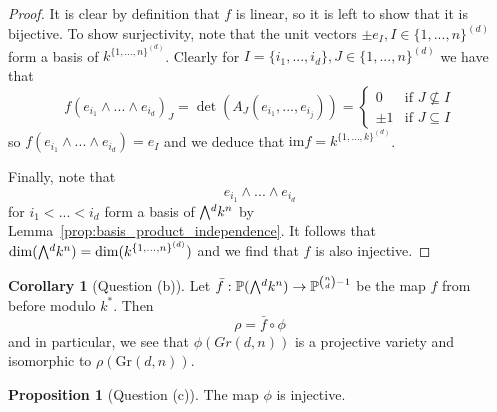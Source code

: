 \documentclass{scrartcl}
\newcommand{\Proj}{\mathbb{P}}
\newcommand{\Gr}{\mathrm{Gr}}
\newcommand{\extpow}{\mathchoice{{\textstyle\bigwedge}}
    {{\bigwedge}}
    {{\textstyle\wedge}}
    {{\scriptstyle\wedge}}}
\theoremstyle{definition}
\newtheorem{proposition}[subsection]{Proposition}
\newtheorem{corollary}[subsection]{Corollary}
\begin{document}
\begin{proof}
    It is clear by definition that $f$ is linear, so it is left to show that it is bijective. 
    To show surjectivity, note that the unit vectors $\pm e_I, I \in \{1, ..., n\}^{(d)}$ form a basis of $k^{\{1, ..., n\}^{(d)}}$.
    Clearly for $I = \{i_1, ..., i_d\}, J \in \{1, ..., n\}^{(d)}$ we have that
    \begin{equation*}
        f(e_{i_1} \wedge ... \wedge e_{i_d})_J = \det(A_J(e_{i_1}, ..., e_{i_j})) = \begin{cases}
            0 & \text{if $J \not\subseteq I$} \\
            \pm 1 & \text{if $J \subseteq I$}
        \end{cases}
    \end{equation*}
    so $f(e_{i_1} \wedge ... \wedge e_{i_d}) = e_I$ and we deduce that $\mathrm{im}f = k^{\{1, ..., k\}^{(d)}}$.

    Finally, note that
    \begin{equation*}
        e_{i_1} \wedge ... \wedge e_{i_d}
    \end{equation*}
    for $i_1 < ... < i_d$ form a basis of $\extpow^d k^n$ by Lemma~\ref{prop:basis_product_independence}.
    It follows that $\dim(\extpow^d k^n) = \dim(k^{\{1, ..., n\}^{(d)}})$ and we find that $f$ is also injective.
\end{proof}
\begin{corollary}[Question (b)]
    \label{prop:image_phi}
    Let $\bar{f}: \Proj(\extpow^d k^n) \to \Proj^{{n \choose d} - 1}$ be the map $f$ from before modulo $k^*$.
    Then
    \begin{equation*}
        \rho = \bar{f} \circ \phi
    \end{equation*}
    and in particular, we see that $\phi(Gr(d, n))$ is a projective variety and isomorphic to $\rho(\Gr(d, n))$.
\end{corollary}
\begin{proposition}[Question (c)]
    The map $\phi$ is injective.
\end{proposition}
\end{document}
